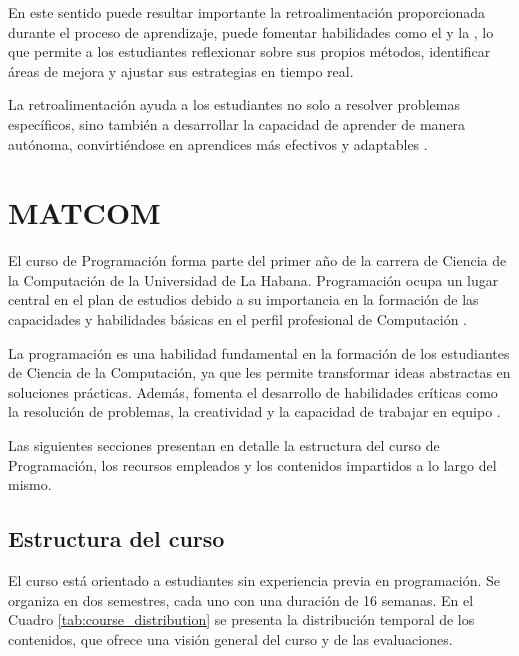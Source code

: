 \documentclass{article}
\begin{document}
En este sentido puede resultar importante la retroalimentación proporcionada durante el proceso de aprendizaje, puede fomentar habilidades como el  y la , lo que permite a los estudiantes reflexionar sobre sus propios métodos, identificar áreas de mejora y ajustar sus estrategias en tiempo real.

La retroalimentación ayuda a los estudiantes no solo a resolver problemas específicos, sino también a desarrollar la capacidad de aprender de manera autónoma, convirtiéndose en aprendices más efectivos y adaptables \cite{shute2008focus}.


\section{MATCOM}

El curso de Programación forma parte del primer año de la carrera de Ciencia de la Computación de la Universidad de La Habana. Programación ocupa un lugar central en el plan de estudios debido a su importancia en la formación de las capacidades y habilidades básicas en el perfil profesional de Computación \cite{plan_estudio_e_2017}.

La programación es una habilidad fundamental en la formación de los estudiantes de Ciencia de la Computación, ya que les permite transformar ideas abstractas en soluciones prácticas. Además, fomenta el desarrollo de habilidades críticas como la resolución de problemas, la creatividad y la capacidad de trabajar en equipo \cite{plan_estudio_e_2017}.

Las siguientes secciones presentan en detalle la estructura del curso de Programación, los recursos empleados y los contenidos impartidos a lo largo del mismo.

\subsection{Estructura del curso}

El curso está orientado a estudiantes sin experiencia previa en programación. Se organiza en dos semestres, cada uno con una duración de 16 semanas. En el Cuadro \ref{tab:course_distribution} se presenta la distribución temporal de los contenidos, que ofrece una visión general del curso y de las evaluaciones.
\end{document}
